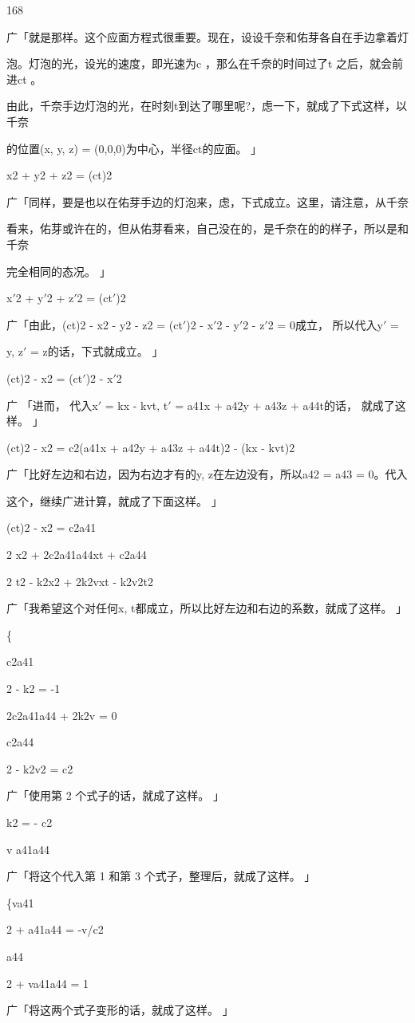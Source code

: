 168\par
广「就是那样。这个应面方程式很重要。现在，设设千奈和佑芽各自在手边拿着灯\par
泡。灯泡的光，设光的速度，即光速为c ，那么在千奈的时间过了t 之后，就会前进ct 。\par
由此，千奈手边灯泡的光，在时刻t到达了哪里呢?，虑一下，就成了下式这样，以千奈\par
的位置(x, y, z) = (0,0,0)为中心，半径ct的应面。 」\par
x2 + y2 + z2 = (ct)2\par
广「同样，要是也以在佑芽手边的灯泡来，虑，下式成立。这里，请注意，从千奈\par
看来，佑芽或许在的，但从佑芽看来，自己没在的，是千奈在的的样子，所以是和千奈\par
完全相同的态况。 」\par
x$\prime$2 + y$\prime$2 + z$\prime$2 = (ct$\prime$)2\par
广「由此，(ct)2 - x2 - y2 - z2 = (ct$\prime$)2 - x$\prime$2 - y$\prime$2 - z$\prime$2 = 0成立， 所以代入y$\prime$ =\par
y, z$\prime$ = z的话，下式就成立。 」\par
(ct)2 - x2 = (ct$\prime$)2 - x$\prime$2\par
广 「进而， 代入x$\prime$ = kx - kvt, t$\prime$ = a41x + a42y + a43z + a44t的话， 就成了这样。 」\par
(ct)2 - x2 = c2(a41x + a42y + a43z + a44t)2 - (kx - kvt)2\par
广「比好左边和右边，因为右边才有的y, z在左边没有，所以a42 = a43 = 0。代入\par
这个，继续广进计算，就成了下面这样。 」\par
(ct)2 - x2 = c2a41\par
2 x2 + 2c2a41a44xt + c2a44\par
2 t2 - k2x2 + 2k2vxt - k2v2t2\par
广「我希望这个对任何x, t都成立，所以比好左边和右边的系数，就成了这样。 」\par
\{\par
c2a41\par
2 - k2 = -1\par
2c2a41a44 + 2k2v = 0\par
c2a44\par
2 - k2v2 = c2\par
广「使用第 2 个式子的话，就成了这样。 」\par
k2 = - c2\par
v a41a44\par
广「将这个代入第 1 和第 3 个式子，整理后，就成了这样。 」\par
\{va41\par
2 + a41a44 = -v/c2\par
a44\par
2 + va41a44 = 1\par
广「将这两个式子变形的话，就成了这样。 」\par

